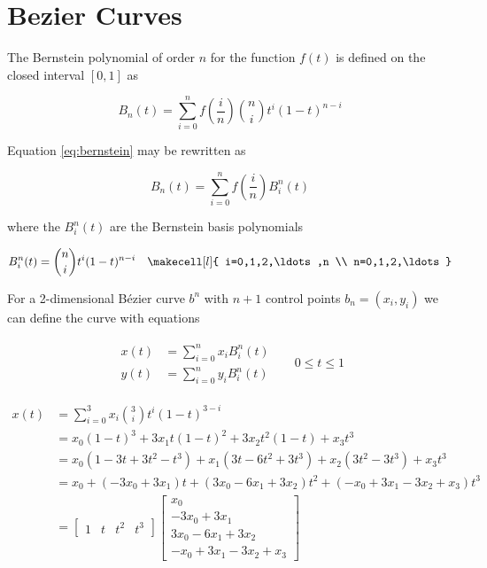 \section{Bezier Curves}
\label{sec:bezier}

The Bernstein polynomial of order $n$ for the function $f(t)$ is defined on the closed interval $[0,1]$ as

\begin{equation}
    B_n(t) = \sum_{i=0}^n f\left(\frac{i}{n}\right){n\choose i} t^i\left(1-t\right)^{n-i}
    \label{eq:bernstein}
\end{equation}

Equation \ref{eq:bernstein} may be rewritten as

\begin{equation}
    B_n(t) = \sum_{i=0}^n f\left(\frac{i}{n}\right) B_i^n(t)
\end{equation}

where the $B_i^n(t)$ are the Bernstein basis polynomials

\begin{align}
    B_i^n(t) = {n\choose i} t^i (1-t)^{n-i} & & \makecell[l]{ i=0,1,2,\ldots,n \\ n=0,1,2,\ldots }
\end{align}

For a 2-dimensional B\'ezier curve $b^n$ with $n+1$ control points $b_n = (x_i, y_i)$ we can define the curve with equations

\begin{align}
    \left.\begin{aligned}
        x(t) &= \sum_{i=0}^n x_i B_i^n(t) \\
        y(t) &= \sum_{i=0}^n y_i B_i^n(t)
    \end{aligned}\right.
    & & 0 \leq t \leq 1
\end{align}

\begin{align}
    x(t) &= \sum_{i=0}^3 x_i {3\choose i} t^i(1-t)^{3-i} \\
         &= x_0(1-t)^3 + 3x_1t(1-t)^2 + 3x_2t^2(1-t) + x_3t^3 \\
         &= x_0(1-3t+3t^2-t^3) + x_1(3t-6t^2+3t^3) + x_2(3t^2-3t^3) + x_3t^3 \\
         &= x_0 + (-3x_0 +3x_1)t + (3x_0 -6x_1 +3x_2)t^2 + (-x_0+3x_1-3x_2+x_3)t^3 \\
         &= \begin{bmatrix}
                1 & t & t^2 & t^3
            \end{bmatrix}
            \begin{bmatrix}
                x_0 \\
                -3x_0 + 3x_1 \\
                3x_0  - 6x_1 + 3x_2 \\
                -x_0  + 3x_1 - 3x_2 + x_3
            \end{bmatrix}
\end{align}


